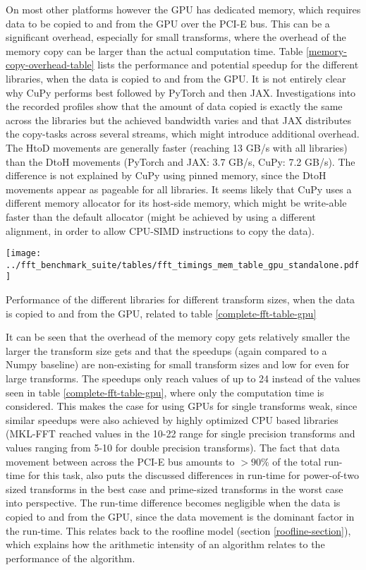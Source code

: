 \documentclass[english,11pt,a4paper,table]{article} %
\begin{document}
On most other platforms however the GPU has dedicated memory, which requires data to be copied to and from the GPU over the PCI-E bus.
This can be a significant overhead, especially for small transforms, where the overhead of the memory copy can be larger than the actual computation time.
Table \ref{memory-copy-overhead-table} lists the performance and potential speedup for the different libraries, when the data is copied to and from the GPU.
It is not entirely clear why CuPy performs best followed by PyTorch and then JAX.
Investigations into the recorded profiles show that the amount of data copied is exactly the same across the libraries but the achieved bandwidth varies and that JAX distributes the copy-tasks across several streams, which might introduce additional overhead.
The HtoD movements are generally faster (reaching 13 GB/s with all libraries) than the DtoH movements (PyTorch and JAX: 3.7 GB/s, CuPy: 7.2 GB/s).
The difference is not explained by CuPy using pinned memory, since the DtoH movements appear as pageable for all libraries. 
It seems likely that CuPy uses a different memory allocator for its host-side memory, which might be write-able faster than the default allocator (might be achieved by using a different alignment, in order to allow CPU-SIMD instructions to copy the data).


\begin{table}
	\centering
	\texttt{[image: ../fft\_benchmark\_suite/tables/fft\_timings\_mem\_table\_gpu\_standalone.pdf]}
	\caption{Performance of the different libraries for different transform sizes, when the data is copied to and from the GPU, related to table \ref{complete-fft-table-gpu}}
	\label{memory-copy-overhead-table}
\end{table}

It can be seen that the overhead of the memory copy gets relatively smaller the larger the transform size gets and that the speedups (again compared to a Numpy baseline) are non-existing for small transform sizes and low for even for large transforms.
The speedups only reach values of up to 24 instead of the values seen in table \ref{complete-fft-table-gpu}, where only the computation time is considered.
This makes the case for using GPUs for single transforms weak, since similar speedups were also achieved by highly optimized CPU based libraries (MKL-FFT reached values in the 10-22 range for single precision transforms and values ranging from 5-10 for double precision transforms).
The fact that data movement between across the PCI-E bus amounts to $>90\%$ of the total run-time for this task, also puts the discussed differences in run-time for power-of-two sized transforms in the best case and prime-sized transforms in the worst case into perspective.
The run-time difference becomes negligible when the data is copied to and from the GPU, since the data movement is the dominant factor in the run-time.
This relates back to the roofline model (section \ref{roofline-section}), which explains how the arithmetic intensity of an algorithm relates to the performance of the algorithm.
\end{document}
